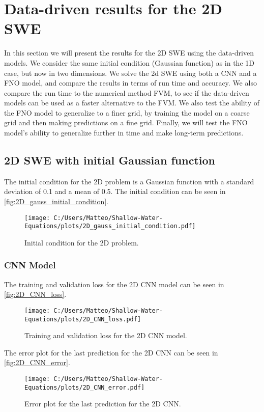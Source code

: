 \section{Data-driven results for the 2D SWE}\label{sec:data-driven-results-2D}
In this section we will present the results for the 2D SWE using the data-driven models.
We consider the same initial condition (Gaussian function) as in the 1D case, but now in two dimensions.
We solve the 2d SWE using both a CNN and a FNO model, and compare the results in terms of run time and accuracy.
We also compare the run time to the numerical method FVM, to see if the data-driven models can be used as a faster alternative to the FVM.
We also test the ability of the FNO model to generalize to a finer grid, by training the model on a coarse grid and then making predictions on a fine grid.
Finally, we will test the FNO model's ability to generalize further in time and make long-term predictions.


\subsection{2D SWE with initial Gaussian function}
The initial condition for the 2D problem is a Gaussian function with a standard deviation of 0.1 and a mean of 0.5.
The initial condition can be seen in \autoref{fig:2D_gauss_initial_condition}.
\begin{figure}[H]
    \centering
    \texttt{[image: C:/Users/Matteo/Shallow-Water-Equations/plots/2D\_gauss\_initial\_condition.pdf]}
    \caption{Initial condition for the 2D problem.}\label{fig:2D_gauss_initial_condition}
\end{figure}
\subsubsection*{CNN Model}


The training and validation loss for the 2D CNN model can be seen in \autoref{fig:2D_CNN_loss}.
\begin{figure}[H]
    \centering
    \texttt{[image: C:/Users/Matteo/Shallow-Water-Equations/plots/2D\_CNN\_loss.pdf]}
    \caption{Training and validation loss for the 2D CNN model.}\label{fig:2D_CNN_loss}
\end{figure}

The error plot for the last prediction for the 2D CNN can be seen in \autoref{fig:2D_CNN_error}.
\begin{figure}[H]
    \centering
    \texttt{[image: C:/Users/Matteo/Shallow-Water-Equations/plots/2D\_CNN\_error.pdf]}
    \caption{Error plot for the last prediction for the 2D CNN.}\label{fig:2D_CNN_error}
\end{figure}

